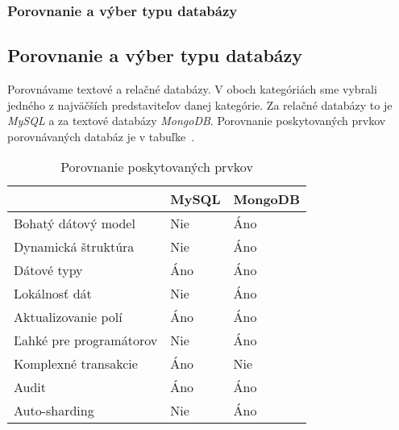 %
%
{
	\subsubsection{Porovnanie a výber typu databázy}
}
{
	\subsection{Porovnanie a výber typu databázy}
}
\label{subsubsection:compare_dbs}

Porovnávame textové a relačné databázy. V oboch kategóriách sme vybrali jedného z najväčších predstaviteľov danej kategórie. Za relačné databázy to je \textit{MySQL} a za textové databázy \textit{MongoDB}. Porovnanie poskytovaných prvkov porovnávaných databáz je v tabuľke~. 

\begin{table}[H]
	\centering
	\caption[Porovnanie poskytovaných prvkov]{Porovnanie poskytovaných prvkov\footnotemark}
	\label{table:features_of_mongodb}
	\begin{tabular}{|l|l|l|}
		\hline
		& \textbf{MySQL} & \textbf{MongoDB} \\ \hline
		Bohatý dátový model & Nie & Áno \\ \hline
		Dynamická štruktúra & Nie & Áno \\ \hline
		Dátové typy & Áno & Áno \\ \hline
		Lokálnosť dát & Nie & Áno \\ \hline
		Aktualizovanie polí & Áno & Áno \\ \hline
		Ľahké pre programátorov & Nie & Áno \\ \hline
		Komplexné transakcie & Áno & Nie \\ \hline
		Audit & Áno & Áno \\ \hline
		Auto-sharding & Nie & Áno \\ \hline
	\end{tabular}
\end{table}

